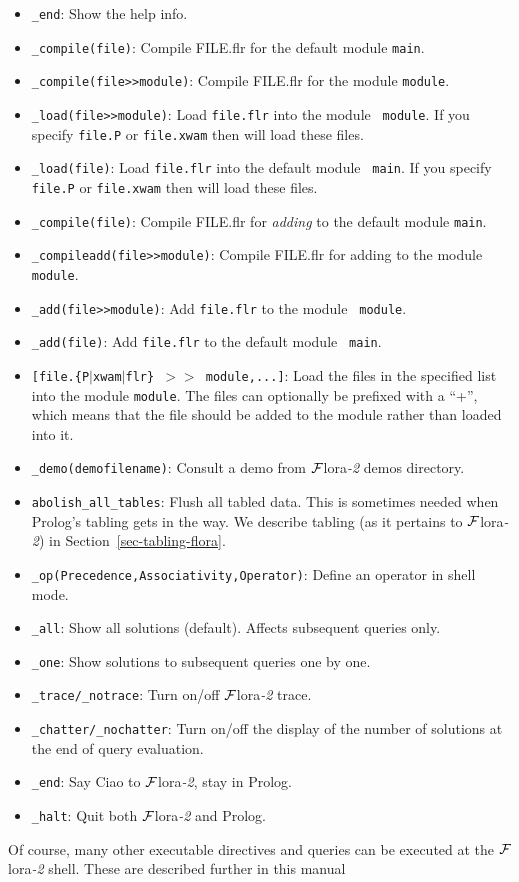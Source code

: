 \documentclass[11pt]{article}
\newcommand{\FLORA}{{\mbox{\sc ${\cal F}${lora}\rm\emph{-2}}}\xspace}
\newcommand{\ofile}{xwam}
\begin{document}
\begin{itemize}
\item {\tt \_end}:
    Show the help info.
\item {\tt \_compile(file)}:
    Compile FILE.flr for the default module {\tt main}.
\item {\tt \_compile(file>>module)}:
    Compile FILE.flr for the module {\tt module}.
  \item {\tt \_load(file>>module)}: Load {\tt file.flr} into the module {\tt
      module}. If you specify {\tt file.P} or {\tt file.\ofile} then will load
    these files.
  \item {\tt \_load(file)}: Load {\tt file.flr} into the default module {\tt
      main}. If you specify {\tt file.P} or {\tt file.\ofile} then will load
    these files.
\item {\tt \_compile(file)}:
    Compile FILE.flr for \emph{adding} to the default module {\tt main}.
\item {\tt \_compileadd(file>>module)}:
    Compile FILE.flr for adding to the module {\tt module}.
  \item {\tt \_add(file>>module)}: Add {\tt file.flr} to the module {\tt
      module}.
  \item {\tt \_add(file)}: Add {\tt file.flr} to the default module {\tt
      main}. 
\item {\tt [file.\{P$|$\ofile$|$flr\} $>>$ module,...]}:
    Load the files in the specified list into the module {\tt module}.
    The files can optionally be prefixed with a ``+'', which means that the
    file should be added to the module rather than loaded into it.
\item {\tt \_demo(demofilename)}:
    Consult a demo from \FLORA demos directory.
\item {\tt abolish\_all\_tables}:
    Flush all tabled data. This is sometimes needed when Prolog's tabling 
    gets in the way. We describe tabling (as it pertains to \FLORA) in
    Section~\ref{sec-tabling-flora}.
\item {\tt \_op(Precedence,Associativity,Operator)}:
    Define an operator in shell mode.
\item {\tt \_all}:
    Show all solutions (default). Affects subsequent queries only.
\item {\tt \_one}:
    Show solutions to subsequent queries one by one.
\item {\tt \_trace/\_notrace}:
    Turn on/off \FLORA trace.
\item {\tt \_chatter/\_nochatter}:
    Turn on/off the display of the number of solutions at the end of query
    evaluation.
\item {\tt \_end}:
    Say Ciao to \FLORA, stay in Prolog.
\item {\tt \_halt}:
    Quit both \FLORA and Prolog.
\end{itemize}
Of course, many other executable directives and queries can be executed at
the \FLORA shell. These are described further in this manual
\end{document}
